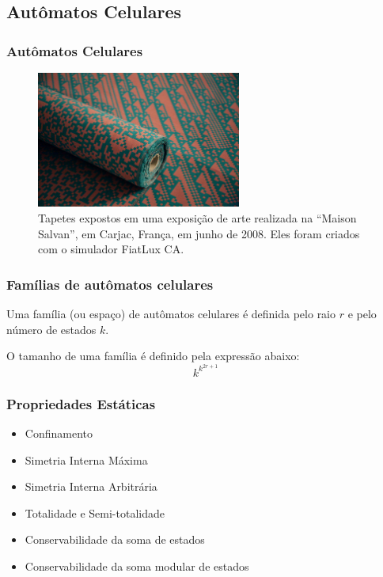 \documentclass[aspectratio=43,hyperref={pdfpagelabels=false}]{beamer}
\begin{document}
 \subsection*{Autômatos Celulares}
 \begin{frame}
    \frametitle{Autômatos Celulares}

    \begin{figure}[h!]
        \centering
        \includegraphics[width=0.6\textwidth]{fig_carpet.jpg}
        \caption{Tapetes expostos em uma exposição de arte realizada na ``Maison Salvan'', em Carjac, França, em junho de 2008. Eles foram criados com o simulador FiatLux CA.}
    \end{figure}

 \end{frame}





\begin{frame}
\frametitle{Famílias de autômatos celulares}
Uma família (ou espaço) de autômatos celulares é definida pelo raio $r$ e pelo número de estados $k$.

O tamanho de uma família é definido pela expressão abaixo:
\begin{equation}
k^{k^{2r+1}}
\label{eq:tamFamilia}
\end{equation}
\end{frame}

 \begin{frame}
     \frametitle{Propriedades Estáticas}
     \begin{itemize}
           \item Confinamento
           \item Simetria Interna Máxima
           \item Simetria Interna Arbitrária
           \item Totalidade e Semi-totalidade
           \item Conservabilidade da soma de estados
           \item Conservabilidade da soma modular de estados %
     \end{itemize}
 \end{frame}
\end{document}
